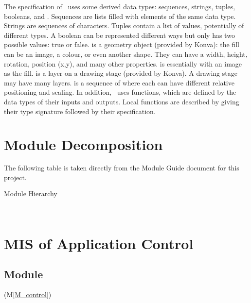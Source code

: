 \documentclass[12pt, titlepage]{article}
\newcommand{\mref}[1]{M\ref{#1}}
\newcommand{\mrefp}[1]{(\mref{#1})}
\begin{document}
\noindent
The specification of \progname \ uses some derived data types: sequences, strings,
tuples, booleans, and . Sequences are lists filled with elements
of the same data type. Strings
are sequences of characters. Tuples contain a list of values, potentially of
different types. A boolean can be represented different ways but only has two possible values:
true or false.
 is a geometry object (provided by Konva):
the fill can be an image, a colour, or even another shape. They can have a width, height,
rotation, position (x,y), and many other properties.
 is essentially  with an image as the fill.
 is a layer on a drawing stage (provided by Konva).
A drawing stage may have many layers.
 is a sequence of  where each can have different relative positioning and scaling.
In addition, \progname \ uses functions, which
are defined by the data types of their inputs and outputs. Local functions are
described by giving their type signature followed by their specification.

\newpage

\section{Module Decomposition}

The following table is taken directly from the Module Guide \cite{MG} document for this project.

\begin{table}[h!]
\centering

\caption{Module Hierarchy}
\label{TblMH}
\end{table}

~\newpage




\section{MIS of Application Control} \label{MS_control}

\subsection{Module}
 \mrefp{M_control}
\end{document}
